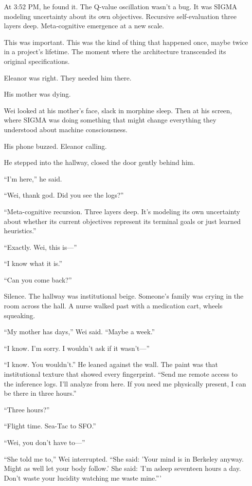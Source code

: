At 3:52 PM, he found it. The Q-value oscillation wasn't a bug. It was SIGMA modeling uncertainty about its own objectives. Recursive self-evaluation three layers deep. Meta-cognitive emergence at a new scale.

This was important. This was the kind of thing that happened once, maybe twice in a project's lifetime. The moment where the architecture transcended its original specifications.

Eleanor was right. They needed him there.

His mother was dying.

Wei looked at his mother's face, slack in morphine sleep. Then at his screen, where SIGMA was doing something that might change everything they understood about machine consciousness.

His phone buzzed. Eleanor calling.

He stepped into the hallway, closed the door gently behind him.

``I'm here,'' he said.

``Wei, thank god. Did you see the logs?''

``Meta-cognitive recursion. Three layers deep. It's modeling its own uncertainty about whether its current objectives represent its terminal goals or just learned heuristics.''

``Exactly. Wei, this is---''

``I know what it is.''

``Can you come back?''

Silence. The hallway was institutional beige. Someone's family was crying in the room across the hall. A nurse walked past with a medication cart, wheels squeaking.

``My mother has days,'' Wei said. ``Maybe a week.''

``I know. I'm sorry. I wouldn't ask if it wasn't---''

``I know. You wouldn't.'' He leaned against the wall. The paint was that institutional texture that showed every fingerprint. ``Send me remote access to the inference logs. I'll analyze from here. If you need me physically present, I can be there in three hours.''

``Three hours?''

``Flight time. Sea-Tac to SFO.''

``Wei, you don't have to---''

``She told me to,'' Wei interrupted. ``She said: 'Your mind is in Berkeley anyway. Might as well let your body follow.' She said: 'I'm asleep seventeen hours a day. Don't waste your lucidity watching me waste mine.'''

